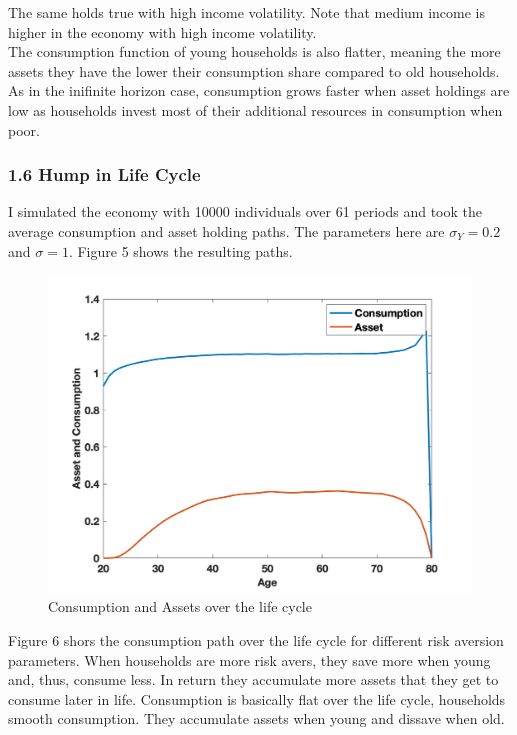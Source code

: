 \documentclass[letterpaper,12pt]{article}
\begin{document}
The same holds true with high income volatility. Note that medium income is higher in the economy with high income volatility. \\
The consumption function of young households is also flatter, meaning the more assets they have the lower their consumption share compared to old households. As in the inifinite horizon case, consumption grows faster when asset holdings are low as households invest most of their additional resources in consumption when poor.





\subsubsection*{1.6 Hump in Life Cycle}
I simulated the economy with 10000 individuals over 61 periods and took the average consumption and asset holding paths. The parameters here are $\sigma_Y = 0.2$ and $\sigma = 1$. Figure 5 shows the resulting paths. \\

\begin{figure}
\includegraphics[scale=0.45]{Figures/Part1_PE/sim_simple}
\caption{Consumption and Assets over the life cycle}
\end{figure}

Figure 6 shors the consumption path over the life cycle for different risk aversion parameters. When households are more risk avers, they save more when young and, thus, consume less. In return they accumulate more assets that they get to consume later in life. 
Consumption is basically flat over the life cycle, households smooth consumption. They accumulate assets when young and dissave when old. \\ 
\end{document}
